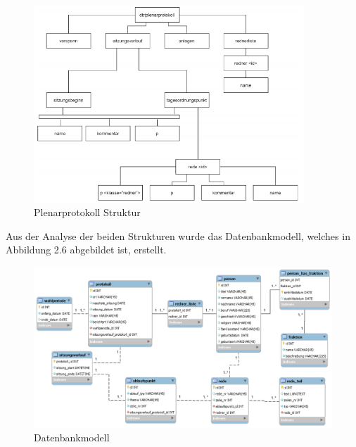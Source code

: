 \begin{figure}[H]
    \centering
    \includegraphics[width=4in]{images/02-Crawler/plenarptokoll_struktur.PNG}
    \caption{Plenarprotokoll Struktur}
    \label{fig:plenarprotokollStruktur}
\end{figure}

Aus der Analyse der beiden Strukturen wurde das Datenbankmodell, welches in Abbildung 2.6 abgebildet ist, erstellt.

\begin{figure}[H]
    \centering
    \includegraphics[width=5in]{images/02-Crawler/db_model_bild.png}
    \caption{Datenbankmodell}
    \label{fig:datenbankmodell}
\end{figure}

